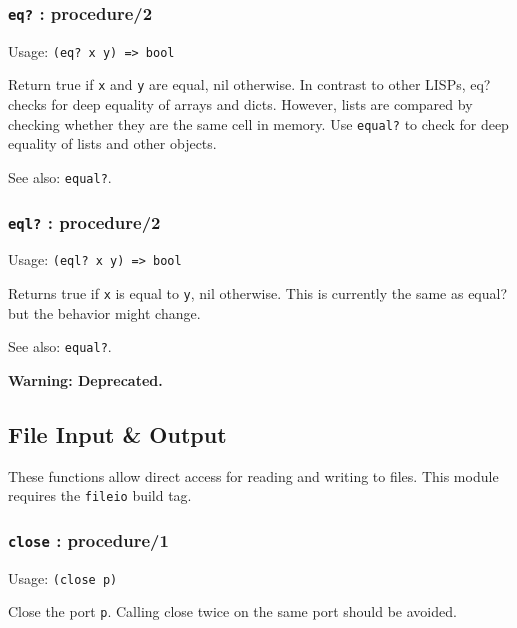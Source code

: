 \documentclass[
]{article}
\newcommand{\passthrough}[1]{#1}
\begin{document}
\hypertarget{eq-procedure2}{%
\subsubsection{\texorpdfstring{\texttt{eq?} :
procedure/2}{eq? : procedure/2}}\label{eq-procedure2}}

Usage: \passthrough{\lstinline!(eq? x y) => bool!}

Return true if \passthrough{\lstinline!x!} and
\passthrough{\lstinline!y!} are equal, nil otherwise. In contrast to
other LISPs, eq? checks for deep equality of arrays and dicts. However,
lists are compared by checking whether they are the same cell in memory.
Use \passthrough{\lstinline!equal?!} to check for deep equality of lists
and other objects.

See also: \passthrough{\lstinline!equal?!}.

\hypertarget{eql-procedure2}{%
\subsubsection{\texorpdfstring{\texttt{eql?} :
procedure/2}{eql? : procedure/2}}\label{eql-procedure2}}

Usage: \passthrough{\lstinline!(eql? x y) => bool!}

Returns true if \passthrough{\lstinline!x!} is equal to
\passthrough{\lstinline!y!}, nil otherwise. This is currently the same
as equal? but the behavior might change.

See also: \passthrough{\lstinline!equal?!}.

\textbf{Warning: Deprecated.}

\hypertarget{file-input-output}{%
\subsection{File Input \& Output}\label{file-input-output}}

These functions allow direct access for reading and writing to files.
This module requires the \passthrough{\lstinline!fileio!} build tag.

\hypertarget{close-procedure1}{%
\subsubsection{\texorpdfstring{\texttt{close} :
procedure/1}{close : procedure/1}}\label{close-procedure1}}

Usage: \passthrough{\lstinline!(close p)!}

Close the port \passthrough{\lstinline!p!}. Calling close twice on the
same port should be avoided.
\end{document}

